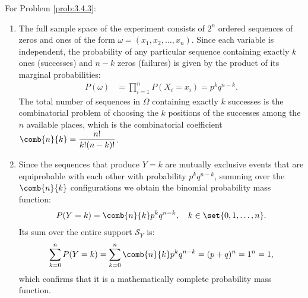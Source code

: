 \begin{solucion}
	\label{sol:3.4.3}
	For Problem \ref{prob:3.4.3}:
	\begin{enumerate}
		\item The full sample space of the experiment consists of $2^n$ ordered sequences of zeros and ones of the form $\omega = (x_1, x_2, \dots, x_n)$. Since each variable is independent, the probability of any particular sequence containing exactly $k$ ones (successes) and $n-k$ zeros (failures) is given by the product of its marginal probabilities:
		\begin{align*}
			P(\omega) &= \prod_{i=1}^n P(X_i = x_i) = p^k q^{n-k}.
		\end{align*}
		The total number of sequences in $\Omega$ containing exactly $k$ successes is the combinatorial problem of choosing the $k$ positions of the successes among the $n$ available places, which is the combinatorial coefficient $\comb{n}{k} = \dfrac{n!}{k!(n-k)!}$.
		\item Since the sequences that produce $Y=k$ are mutually exclusive events that are equiprobable with each other with probability $p^k q^{n-k}$, summing over the $\comb{n}{k}$ configurations we obtain the binomial probability mass function:
		\begin{align*}
			P(Y = k) = \comb{n}{k} p^k q^{n-k}, \quad k \in \set{0, 1, \dots, n}.
		\end{align*}
		Its sum over the entire support $\mathcal{S}_Y$ is:
		\begin{align*}
			\sum_{k=0}^n P(Y = k) = \sum_{k=0}^n \comb{n}{k} p^k q^{n-k} = (p + q)^n = 1^n = 1,
		\end{align*}
		which confirms that it is a mathematically complete probability mass function.
	\end{enumerate}
\end{solucion}

